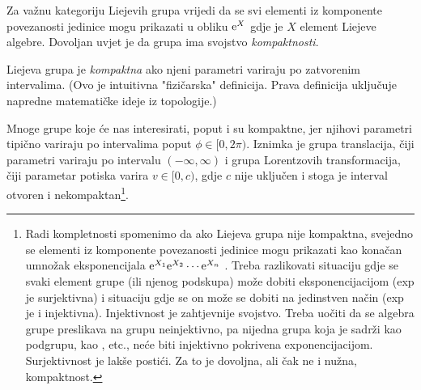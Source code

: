 Za važnu kategoriju Liejevih grupa vrijedi da se svi elementi iz 
komponente povezanosti jedinice mogu prikazati u obliku
$\textrm{e}^{X}$ gdje je $X$ element
Liejeve algebre. Dovoljan uvjet je da grupa ima svojstvo \emph{kompaktnosti}.
\begin{definicija}[Kompaktnost]
Liejeva grupa je \emph{kompaktna} ako njeni parametri variraju po zatvorenim intervalima.
(Ovo je intuitivna "fizičarska" definicija. Prava definicija uključuje napredne
matematičke ideje iz topologije.)
\label{def:kompaktnost}
\end{definicija}
Mnoge grupe koje će nas interesirati, poput
 i  su kompaktne, jer njihovi parametri tipično variraju
po intervalima poput $\phi \in [0, 2\pi)$. Iznimka je
grupa translacija, čiji parametri variraju po intervalu $(-\infty,
\infty)$ i grupa Lorentzovih transformacija, čiji parametar
potiska varira $v \in [0, c)$, gdje $c$ nije uključen i stoga
je interval otvoren i nekompaktan\footnote{Radi
    kompletnosti spomenimo da ako Liejeva grupa nije kompaktna, 
    svejedno se elementi iz komponente
povezanosti jedinice mogu prikazati kao konačan umnožak eksponencijala
$\textrm{e}^{X_1} \textrm{e}^{X_2}\cdots \textrm{e}^{X_n}$ \cite{Stilwell:2008}.
Treba razlikovati situaciju gdje se svaki element
grupe (ili njenog podskupa) može dobiti eksponencijacijom (exp
je surjektivna) i situaciju gdje se on može se dobiti na jedinstven način 
(exp je i injektivna).
Injektivnost je zahtjevnije svojstvo. 
Treba uočiti da se algebra grupe  preslikava na grupu neinjektivno,
pa nijedna grupa koja
je sadrži kao podgrupu, kao ,  etc., neće biti injektivno pokrivena
exponencijacijom. Surjektivnost je lakše postići.
Za to je dovoljna, ali čak ne i nužna, kompaktnost.}.



